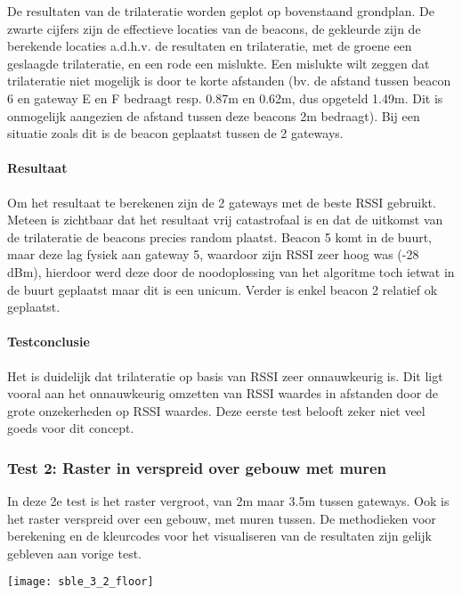 De resultaten van de trilateratie worden geplot op bovenstaand grondplan. De zwarte cijfers zijn de effectieve locaties van de beacons, de gekleurde zijn de berekende locaties a.d.h.v. de resultaten en trilateratie, met de groene een geslaagde trilateratie, en een rode een mislukte. Een mislukte wilt zeggen dat trilateratie niet mogelijk is door te korte afstanden (bv. de afstand tussen beacon 6 en gateway E en F bedraagt resp. 0.87m en 0.62m, dus opgeteld 1.49m. Dit is onmogelijk aangezien de afstand tussen deze beacons 2m bedraagt). Bij een situatie zoals dit is de beacon geplaatst tussen de 2 gateways.

\paragraph{Resultaat}
Om het resultaat te berekenen zijn de 2 gateways met de beste RSSI gebruikt. Meteen is zichtbaar dat het resultaat vrij catastrofaal is en dat de uitkomst van de trilateratie de beacons precies random plaatst. Beacon 5 komt in de buurt, maar deze lag fysiek aan gateway 5, waardoor zijn RSSI zeer hoog was (-28 dBm), hierdoor werd deze door de noodoplossing van het algoritme toch ietwat in de buurt geplaatst maar dit is een unicum. Verder is enkel beacon 2 relatief ok geplaatst.

\paragraph{Testconclusie}
Het is duidelijk dat trilateratie op basis van RSSI zeer onnauwkeurig is. Dit ligt vooral aan het onnauwkeurig omzetten van RSSI waardes in afstanden door de grote onzekerheden op RSSI waardes. Deze eerste test belooft zeker niet veel goeds voor dit concept.

\subsubsection{Test 2: Raster in verspreid over gebouw met muren}
\begin{minipage}{0.55\textwidth}
In deze 2e test is het raster vergroot, van 2m maar 3.5m tussen gateways. Ook is het raster verspreid over een gebouw, met muren tussen.
De methodieken voor berekening en de kleurcodes voor het visualiseren van de resultaten zijn gelijk gebleven aan vorige test.
\end{minipage}
\hfill
\begin{minipage}{0.42\textwidth}
	\texttt{[image: sble\_3\_2\_floor]}
\end{minipage}


